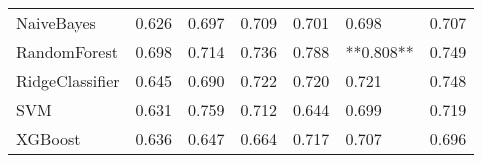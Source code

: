 \begin{tabular}{lllllll}
                     NaiveBayes & 0.626 &                     0.697 &                 0.709 &                  0.701 &                                   0.698 &    0.707 \\
                   RandomForest & 0.698 &                     0.714 &                 0.736 &                  0.788 &                               **0.808** &    0.749 \\
                RidgeClassifier & 0.645 &                     0.690 &                 0.722 &                  0.720 &                                   0.721 &    0.748 \\
                            SVM & 0.631 &                     0.759 &                 0.712 &                  0.644 &                                   0.699 &    0.719 \\
                        XGBoost & 0.636 &                     0.647 &                 0.664 &                  0.717 &                                   0.707 &    0.696 \\
\bottomrule
\end{tabular}
